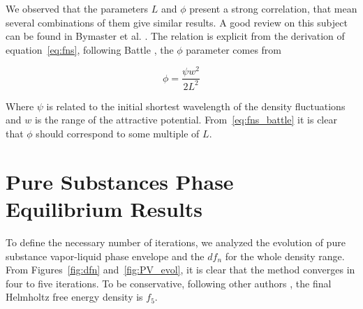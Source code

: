 \documentclass[preprint,12pt,3p]{elsarticle}
\begin{document}
\begin{table}[ht!]
\centering
\caption{Estimated Parameters for the renormalization method}
\label{table:renorm_param}
\end{table}

	We observed that the parameters $L$ and $\phi$ present a strong correlation, that mean several combinations of them give similar results. A good review on this subject can be found in Bymaster et al. \citep{bymaster2008renormalization}. The relation is explicit from the derivation of equation~\ref{eq:fns}, following Battle \cite{battlerenorm}, the $\phi$ parameter comes from
	
\begin{equation} \label{eq:fns_battle}
    \phi = \frac{\psi w^2}{2L^2}
\end{equation}

    Where $\psi$ is related to the initial shortest wavelength of the density fluctuations and $w$ is the range of the attractive potential. From~\ref{eq:fns_battle} it is clear that $\phi$ should correspond to some multiple of $L$.
    
\section{Pure Substances Phase Equilibrium Results}

	To define the necessary number of iterations, we analyzed the evolution of pure substance vapor-liquid phase envelope and the $df_{n}$ for the whole density range. From Figures~\ref{fig:dfn} and~\ref{fig:PV_evol}, it is clear that the method converges in four to five iterations. To be conservative, following other authors  \cite{llovell2004thermodynamic,cai2004thermodynamics,pcm2017application}, the final Helmholtz free energy density is $f_{5}$.
	
\end{document}
